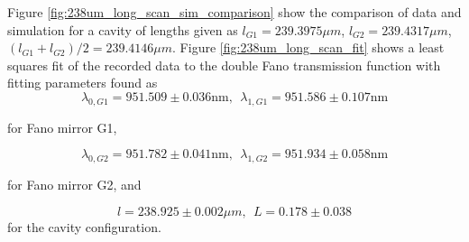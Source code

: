 Figure \ref{fig:238um_long_scan_sim_comparison} show the comparison of data and simulation for a cavity of lengths given as $l_{G1} = 239.3975 \mu m$, $l_{G2} = 239.4317 \mu m$, $(l_{G1} + l_{G2})/2 = 239.4146 \mu m$. Figure \ref{fig:238um_long_scan_fit} shows a least squares fit of the recorded data to the double Fano transmission function with fitting parameters found as 
\begin{equation}
    \lambda_{0,G1} = 951.509 \pm 0.036 \text{nm}, \:\: \lambda_{1,G1} = 951.586 \pm 0.107 \text{nm}
\end{equation}

for Fano mirror G1,

\begin{equation}
    \lambda_{0,G2} = 951.782 \pm 0.041 \text{nm}, \:\: \lambda_{1,G2} = 951.934 \pm 0.058 \text{nm}
\end{equation}

for Fano mirror G2, and

\begin{equation}
    l = 238.925 \pm 0.002 \mu m, \:\: L = 0.178 \pm 0.038
\end{equation}
for the cavity configuration.

